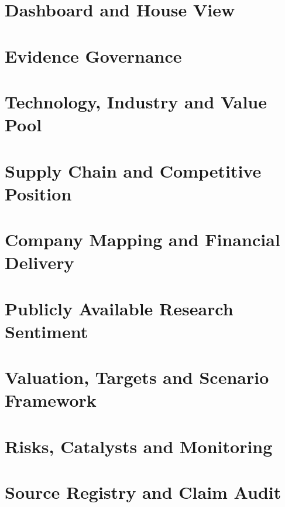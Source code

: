 \documentclass[a4paper,11pt,openany,fontset=none]{ctexrep}
\begin{document}
\astockcover

\tableofcontents
\clearpage

\chapter{Dashboard and House View}


\chapter{Evidence Governance}


\chapter{Technology, Industry and Value Pool}


\chapter{Supply Chain and Competitive Position}


\chapter{Company Mapping and Financial Delivery}


\chapter{Publicly Available Research Sentiment}


\chapter{Valuation, Targets and Scenario Framework}


\chapter{Risks, Catalysts and Monitoring}


\appendix
\chapter{Source Registry and Claim Audit}

\end{document}
